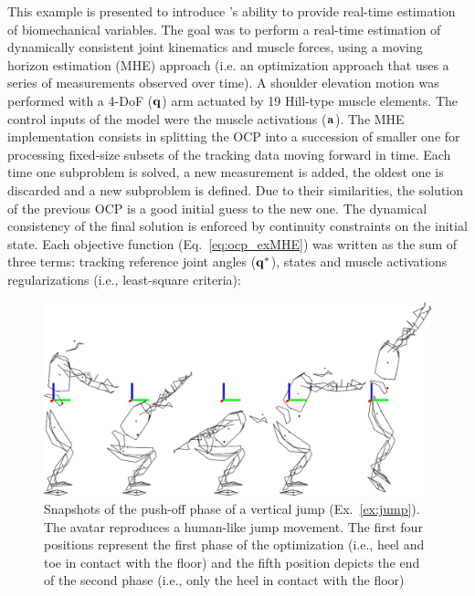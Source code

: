 This example is presented to introduce \Bioptim's ability to provide real-time estimation of biomechanical variables.
The goal was to perform a real-time estimation of dynamically consistent joint kinematics and muscle forces, using a moving horizon estimation (MHE) approach (i.e. an optimization approach that uses a series of measurements observed over time). 
A shoulder elevation motion was performed with a 4-DoF ($\bf{q}$) arm actuated by 19 Hill-type muscle elements.
The control inputs of the model were the muscle activations ($\bf{a}$).
The MHE implementation consists in splitting the OCP into a succession of smaller one for processing fixed-size subsets of the tracking data moving forward in time. 
Each time one subproblem is solved, a new measurement is added, the oldest one is discarded and a new subproblem is defined. 
Due to their similarities, the solution of the previous OCP is a good initial guess to the new one. 
The dynamical consistency of the final solution is enforced by continuity constraints on the initial state. 
Each objective function (Eq.~\ref{eq:ocp_exMHE}) was written as the sum of three terms: tracking reference joint angles ($\bf{q^*}$), states and muscle activations regularizations (i.e., least-square criteria): 
\begin{figure}[t!]
\includegraphics[width=\columnwidth]{figures/kinogramme_jump}
\caption{Snapshots of the push-off phase of a vertical jump (Ex.~\ref{ex:jump}). The avatar reproduces a human-like jump movement. The first four positions represent the first phase of the optimization (i.e., heel and toe in contact with the floor) and the fifth position depicts the end of the second phase (i.e., only the heel in contact with the floor)} 
\label{fig:jump}
\end{figure}

